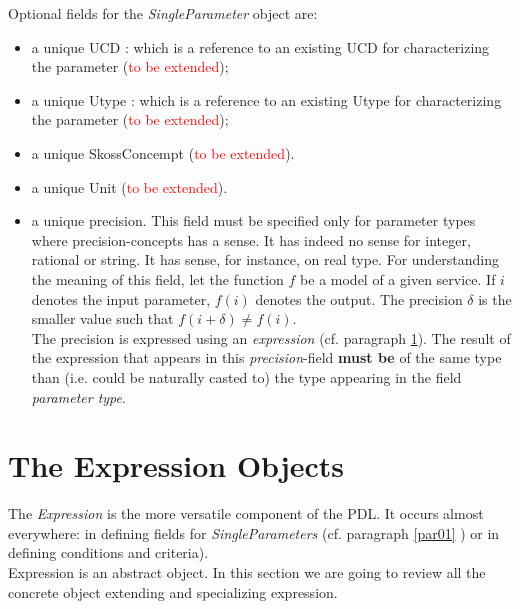\documentclass[11pt]{amsart}
\begin{document}
Optional fields for the {\it SingleParameter} object are:
\begin{itemize}
\item a unique UCD : which is a reference to an existing UCD for characterizing the parameter (\textcolor{red}{to be extended});
\item a unique Utype  : which is a reference to an existing Utype for characterizing the parameter (\textcolor{red}{to be extended});
\item a unique SkossConcempt (\textcolor{red}{to be extended}).
\item a unique Unit (\textcolor{red}{to be extended}).
\item a unique precision. This field must be specified only for parameter types where precision-concepts has a sense. It has indeed no sense for integer, rational or string. It has sense, for instance, on real type. For understanding the meaning of this field, let the function $f$ be a model of a given service. If $i$ denotes the input parameter, $f(i)$ denotes the output. The precision $\delta$ is the smaller value such that $f(i+\delta) \neq f(i)$.\\ The precision is expressed using an {\it expression} (cf. paragraph \ref{par02}). The result of the expression that appears in this {\it precision}-field  {\bf must be} of the same type than (i.e. could be naturally casted to) the type appearing in the field {\it parameter type}.
\end{itemize}

\section{The Expression Objects}\label{par02}
The {\it Expression} is the more versatile component of the PDL. It occurs almost everywhere: in defining fields for {\it SingleParameters} (cf. paragraph \ref{par01} ) or in defining conditions and criteria).\\
Expression is an abstract object. In this section we are going to review all the concrete object extending and specializing expression.
\end{document}
